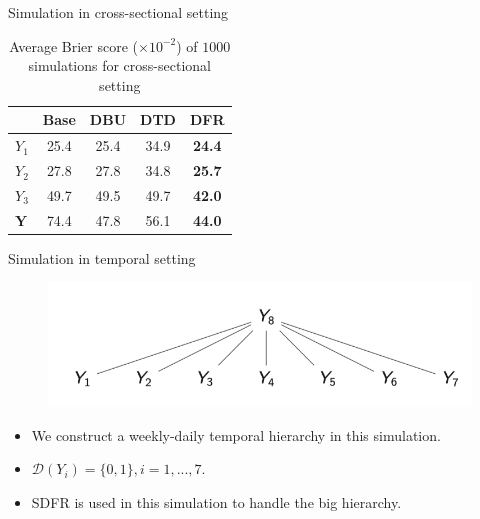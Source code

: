 \documentclass[12pt]{beamer}
\begin{document}
\begin{frame}{Simulation in cross-sectional setting}
    \begin{table}
        \centering
        \caption{Average Brier score ($\times 10^{-2}$) of $1000$ simulations for cross-sectional setting}
        \begin{tabular}{lcccc}
        \toprule
        & Base & DBU & DTD & DFR \\\midrule
        $Y_1$ & 25.4 & 25.4 & 34.9 & \textbf{24.4} \\
        $Y_2$ & 27.8 & 27.8 & 34.8 & \textbf{25.7}\\
        $Y_3$ & 49.7 & 49.5 & 49.7 & \textbf{42.0} \\
        $\mathbf{Y}$ & 74.4 & 47.8 & 56.1 & \textbf{44.0} \\
        \bottomrule
        \end{tabular}
      \end{table}
\end{frame}


\begin{frame}{Simulation in temporal setting}

\begin{figure}
\centering
\includegraphics[width=\textwidth]{figures/temporal.png}
\end{figure}

\begin{itemize}
    \item We construct a weekly-daily temporal hierarchy in this simulation.
    \item $\mathcal{D}(Y_i) = \{ 0, 1 \} , i = 1, . . . , 7$.
    \item SDFR is used in this simulation to handle the big hierarchy.
\end{itemize}

\end{frame}
\end{document}
